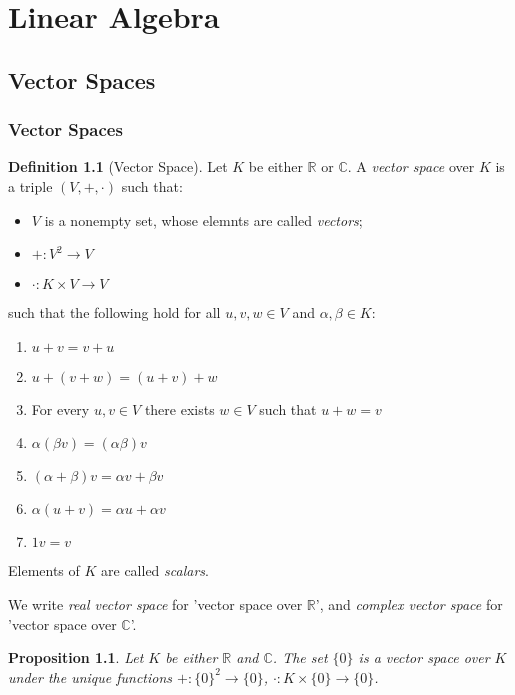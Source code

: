 \documentclass{book}
\newtheorem{prop}[ax]{Proposition}
\theoremstyle{definition}
\newtheorem{df}[ax]{Definition}
\begin{document}
\part{Linear Algebra}

\chapter{Vector Spaces}

\section{Vector Spaces}

\begin{df}[Vector Space]
Let $K$ be either $\mathbb{R}$ or $\mathbb{C}$. A \emph{vector space} over $K$ is a triple $(V,+,\cdot)$ such that:
\begin{itemize}
\item $V$ is a nonempty set, whose elemnts are called \emph{vectors};
\item $+ : V^2 \rightarrow V$
\item $\cdot : K \times V \rightarrow V$
\end{itemize}
such that the following hold for all $u,v,w \in V$ and $\alpha, \beta \in K$:
\begin{enumerate}
\item $u + v = v + u$
\item $u + (v + w) = (u + v) + w$
\item For every $u, v \in V$ there exists $w \in V$ such that $u + w = v$
\item $\alpha (\beta v) = (\alpha \beta) v$
\item $(\alpha + \beta) v = \alpha v + \beta v$
\item $\alpha (u + v) = \alpha u + \alpha v$
\item $1v = v$
\end{enumerate}
Elements of $K$ are called \emph{scalars}.

We write \emph{real vector space} for 'vector space over $\mathbb{R}$', and \emph{complex vector space} for 'vector space over $\mathbb{C}$'.
\end{df}

\begin{prop}
Let $K$ be either $\mathbb{R}$ and $\mathbb{C}$.
The set $\{0\}$ is a vector space over $K$ under the unique functions $+ : \{0\}^2 \rightarrow \{0\}$, $\cdot : K \times \{0\} \rightarrow \{0\}$.
\end{prop}
\end{document}
